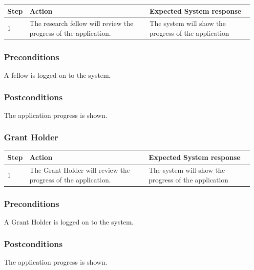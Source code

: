 \documentclass[12pt]{article}
\begin{document}
\begin{center}
\begin{tabular}{|l|p{6cm}|p{8cm}|}
\hline
Step & Action & Expected System response \\
\hline
1 & The research fellow will review the progress of the application. & The system will show the progress of the application \\
\hline
\end{tabular}
\end{center}

\subsubsection*{Preconditions}
A fellow is logged on to the system.

\subsubsection*{Postconditions}
The application progress is shown.

\subsubsection{Grant Holder}

\begin{center}
\begin{tabular}{|l|p{6cm}|p{8cm}|}
\hline
Step & Action & Expected System response \\
\hline
1 & The Grant Holder will review the progress of the application. & The system will show the progress of the application \\
\hline
\end{tabular}
\end{center}

\subsubsection*{Preconditions}
A Grant Holder is logged on to the system.

\subsubsection*{Postconditions}
The application progress is shown.
\end{document}
